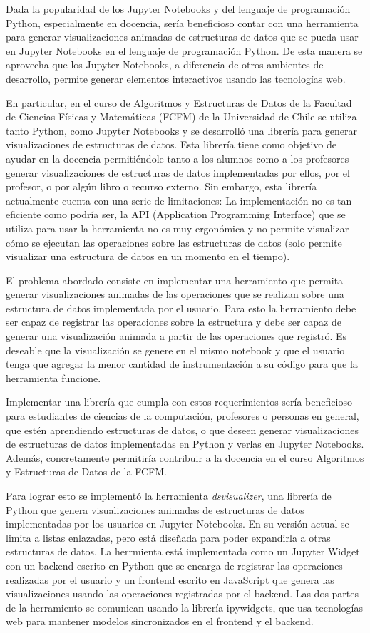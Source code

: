 Dada la popularidad de los Jupyter Notebooks y del lenguaje de programación Python, especialmente en docencia, sería beneficioso contar con una herramienta para generar visualizaciones animadas de estructuras de datos que se pueda usar en Jupyter Notebooks en el lenguaje de programación Python. De esta manera se aprovecha que los Jupyter Notebooks, a diferencia de otros ambientes de desarrollo, permite generar elementos interactivos usando las tecnologías web.

En particular, en el curso de Algoritmos y Estructuras de Datos de la Facultad de Ciencias Físicas y Matemáticas (FCFM) de la Universidad de Chile se utiliza tanto Python, como Jupyter Notebooks y se desarrolló una librería para generar visualizaciones de estructuras de datos. Esta librería tiene como objetivo de ayudar en la docencia permitiéndole tanto a los alumnos como a los profesores generar visualizaciones de estructuras de datos implementadas por ellos, por el profesor, o por algún libro o recurso externo. Sin embargo, esta librería actualmente cuenta con una serie de limitaciones: La implementación no es tan eficiente como podría ser, la API (Application Programming Interface) que se utiliza para usar la herramienta no es muy ergonómica y no permite visualizar cómo se ejecutan las operaciones sobre las estructuras de datos (solo permite visualizar una estructura de datos en un momento en el tiempo).

El problema abordado consiste en implementar una herramiento que permita generar visualizaciones animadas de las operaciones que se realizan sobre una estructura de datos implementada por el usuario. Para esto la herramiento debe ser capaz de registrar las operaciones sobre la estructura y debe ser capaz de generar una visualización animada a partir de las operaciones que registró. Es deseable que la visualización se genere en el mismo notebook y que el usuario tenga que agregar la menor cantidad de instrumentación a su código para que la herramienta funcione.

Implementar una librería que cumpla con estos requerimientos sería beneficioso para estudiantes de ciencias de la computación, profesores o personas en general, que estén aprendiendo estructuras de datos, o que deseen generar visualizaciones de estructuras de datos implementadas en Python y verlas en Jupyter Notebooks. Además, concretamente permitiría contribuir a la docencia en el curso Algoritmos y Estructuras de Datos de la FCFM.

Para lograr esto se implementó la herramienta \textit{dsvisualizer}, una librería de Python que genera visualizaciones animadas de estructuras de datos implementadas por los usuarios en Jupyter Notebooks. En su versión actual se limita a listas enlazadas, pero está diseñada para poder expandirla a otras estructuras de datos. La herrmienta está implementada como un Jupyter Widget con un backend escrito en Python que se encarga de registrar las operaciones realizadas por el usuario y un frontend escrito en JavaScript que genera las visualizaciones usando las operaciones registradas por el backend. Las dos partes de la herramiento se comunican usando la librería ipywidgets, que usa tecnologías web para mantener modelos sincronizados en el frontend y el backend.

